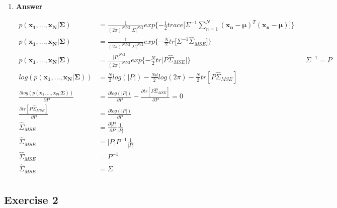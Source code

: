\documentclass[11pt]{article}
\begin{document}
\begin{enumerate}[label=(\alph*)]
\begin{enumerate}[label=(\roman*)]
\end{enumerate}

\newpage

\item  \textbf{Answer}

\begin{align*}
p(\mathbf{x_1,...,x_N|\Sigma}) &= \frac{1}{(2\pi)^{Nd/2}|\Sigma|^{N/2}}exp{\{-\frac{1}{2}}trace[\Sigma^{-1}\sum_{n=1}^N{{(\mathbf{x_n-\mu})^T(\mathbf{x_n-\mu})}]\}}\\
p(\mathbf{x_1,...,x_N|\Sigma}) &= \frac{1}{(2\pi)^{Nd/2}|\Sigma|^{N/2}}exp{\{-\frac{N}{2}}tr[\Sigma^{-1}{\hat{\Sigma}_{MSE}]\}}\\
p(\mathbf{x_1,...,x_N|\Sigma}) &= \frac{|P|^{N/2}}{(2\pi)^{Nd/2}}exp{\{-\frac{N}{2}}tr[P{\hat{\Sigma}_{MSE}]\}}&& \Sigma^{-1} = P\\
log(p(\mathbf{x_1,...,x_N|\Sigma})) &= \frac{N}{2}log(|P|) -\frac{Nd}{2}log(2\pi) -\frac{N}{2}tr[P\hat{\Sigma}_{MSE}] \\
\frac{\partial{log(p(\mathbf{x_1,...,x_N|\Sigma}))}}{\partial{P}} &= \frac{\partial{log(|P|)}}{\partial{P}} - \frac{\partial{tr[P\hat{\Sigma}_{MSE}]}}{\partial{P}} = 0 \\
\frac{\partial{tr[P\hat{\Sigma}_{MSE}]}}{\partial{P}} &= \frac{\partial{log(|P|)}}{\partial{P}} \\
\hat{\Sigma}_{MSE}&= \frac{\partial{|P|}}{\partial{P}} \frac{1}{|P|}\\
\hat{\Sigma}_{MSE}&= |P|P^{-1} \frac{1}{|P|}\\
\hat{\Sigma}_{MSE}&= P^{-1}\\
\hat{\Sigma}_{MSE}&= \Sigma \\
\end{align*}

\end{enumerate}

\subsection*{Exercise 2}
\end{document}
